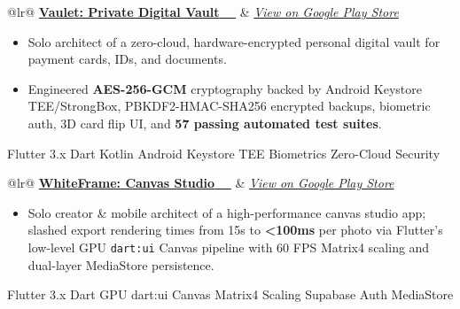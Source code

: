 \documentclass[10pt,a4paper]{article}
\newcommand{\skilltag}[1]{%
    \colorbox{tagbg}{\scriptsize\textcolor{tagtxt}{\textsf{#1}}}\hspace{1.5pt}%
}
\begin{document}
\vspace{2.5pt}

\begin{tabular*}{\textwidth}{@{\extracolsep{\fill}}lr@{}}
\href{https://play.google.com/store/apps/details?id=com.cloudcubit.vaulet&pcampaignid=web_share}{{\small\textbf{\textcolor{primary}{Vaulet: Private Digital Vault}}} \ \faGooglePlay\ \faExternalLink}
& \href{https://play.google.com/store/apps/details?id=com.cloudcubit.vaulet&pcampaignid=web_share}{\footnotesize\textit{\textcolor{subtitle}{View on Google Play Store}}}
\end{tabular*}
{\footnotesize
\begin{itemize}
    \item Solo architect of a zero-cloud, hardware-encrypted personal digital vault for payment cards, IDs, and documents.
    \item Engineered \textbf{AES-256-GCM} cryptography backed by Android Keystore TEE/StrongBox, PBKDF2-HMAC-SHA256 encrypted backups, biometric auth, 3D card flip UI, and \textbf{57 passing automated test suites}.
\end{itemize}
}
\skilltag{Flutter 3.x} \skilltag{Dart} \skilltag{Kotlin} \skilltag{Android Keystore TEE} \skilltag{Biometrics} \skilltag{Zero-Cloud Security}

\vspace{2.5pt}

\begin{tabular*}{\textwidth}{@{\extracolsep{\fill}}lr@{}}
\href{https://play.google.com/store/apps/details?id=com.cloudcubit.whiteframe&pcampaignid=web_share}{{\small\textbf{\textcolor{primary}{WhiteFrame: Canvas Studio}}} \ \faGooglePlay\ \faExternalLink}
& \href{https://play.google.com/store/apps/details?id=com.cloudcubit.whiteframe&pcampaignid=web_share}{\footnotesize\textit{\textcolor{subtitle}{View on Google Play Store}}}
\end{tabular*}
{\footnotesize
\begin{itemize}
    \item Solo creator \& mobile architect of a high-performance canvas studio app; slashed export rendering times from 15s to \textbf{<100ms} per photo via Flutter's low-level GPU \texttt{dart:ui} Canvas pipeline with 60 FPS Matrix4 scaling and dual-layer MediaStore persistence.
\end{itemize}
}
\skilltag{Flutter 3.x} \skilltag{Dart} \skilltag{GPU dart:ui Canvas} \skilltag{Matrix4 Scaling} \skilltag{Supabase Auth} \skilltag{MediaStore}
\end{document}
